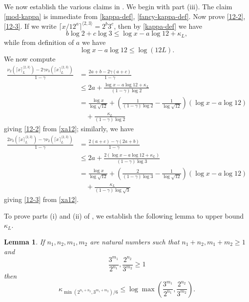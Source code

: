 \documentclass[12pt,a4paper,reqno]{amsart}
\numberwithin{equation}{section}
\theoremstyle{plain}
\newtheorem{lemma}[theorem]{Lemma}
\theoremstyle{definition}
\begin{document}
We now establish the various claims in .  We begin with part (iii).  The claim \eqref{mod-kappa} is immediate from \eqref{kappa-def}, \eqref{fancy-kappa-def}.  Now prove \eqref{12-2}, \eqref{12-3}.  If we write $\lceil x/12^a \rceil^{\langle 2,3 \rangle} = 2^b 3^c$, then by \eqref{kappa-def} we have
$$ b \log 2 + c \log 3 \leq \log x - a \log 12 + \kappa_L,$$
while from definition of $a$ we have
\begin{equation}\label{xa12}
  \log x - a \log 12 \leq \log(12L).
\end{equation}
We now compute
\begin{align*}
  \frac{\nu_2(\lceil x \rceil^{\langle 2,3\rangle}_L) - 2 \gamma \nu_3(\lceil x \rceil^{\langle 2,3\rangle}_L)}{1-\gamma} 
  &= \frac{2a+b - 2\gamma(a+c)}{1-\gamma} \\
  &\leq 2a + \frac{\log x - a \log 12 + \kappa_L}{(1-\gamma) \log 2}  \\
  &= \frac{\log x}{\log \sqrt{12}} + \left( \frac{1}{(1-\gamma)\log 2} - \frac{1}{\log \sqrt{12}}\right) \left(\log x - a \log 12\right)\\
  &\quad 
  + \frac{\kappa_L}{(1-\gamma)\log 2} 
\end{align*}
giving \eqref{12-2} from \eqref{xa12}; similarly, we have
\begin{align*}
  \frac{2\nu_3(\lceil x \rceil^{\langle 2,3\rangle}_L) - \gamma \nu_2(\lceil x \rceil^{\langle 2,3\rangle}_L)}{1-\gamma} 
  &= \frac{2(a+c) - \gamma(2a+b)}{1-\gamma} \\
  &\leq 2a + \frac{2(\log x - a \log 12 + \kappa_L)}{(1-\gamma) \log 3}  \\
  &= \frac{\log x}{\log \sqrt{12}} + \left( \frac{2}{(1-\gamma)\log 3} - \frac{1}{\log \sqrt{12}}\right) \left(\log x - a \log 12\right)\\
  &\quad + \frac{\kappa_L}{(1-\gamma)\log \sqrt{3}} 
\end{align*}
giving \eqref{12-3} from \eqref{xa12}.

To prove parts (i) and (ii) of , we establish the following lemma to upper bound $\kappa_L$.

\begin{lemma}\label{lemcount-0}  If $n_1,n_2,m_1,m_2$ are natural numbers such that $n_1+n_2, m_1+m_2 \geq 1$ and
$$ \frac{3^{m_1}}{2^{n_1}}, \frac{2^{n_2}}{3^{m_2}} \geq 1$$
then
$$ \kappa_{\min( 2^{n_1+n_2},3^{m_1+m_2})/6} \leq \log \max\left(\frac{3^{m_1}}{2^{n_1}}, \frac{2^{n_2}}{3^{m_2}}\right).$$
\end{lemma}
\end{document}
